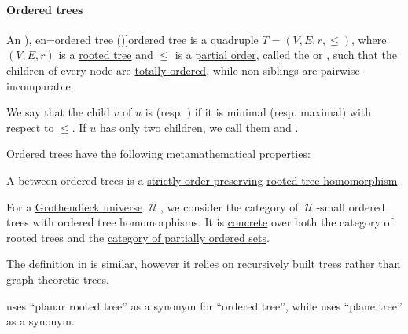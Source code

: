 \paragraph{Ordered trees}

\begin{definition}\label{def:ordered_tree}\mimprovised
  An \term[ru=упорядоченное дерево (\cite[\S 9.3.5]{Новиков2013ДискретнаяМатематика}), en=ordered tree (\cite[573]{Stanley2012CombinatoricsVol1})]{ordered tree} is a quadruple \( T = (V, E, r, \leq) \), where \( (V, E, r) \) is a \hyperref[def:rooted_tree]{rooted tree} and \( {\leq} \) is a \hyperref[def:partially_ordered_set]{partial order}, called the  or , such that the children of every node are \hyperref[def:totally_order_chain]{totally ordered}, while non-siblings are pairwise-incomparable.

  \begin{thmenum}[series=def:ordered_tree]
     We say that the child \( v \) of \( u \) is  (resp. ) if it is minimal (resp. maximal) with respect to \( {\leq} \). If \( u \) has only two children, we call them  and .
  \end{thmenum}

  Ordered trees have the following metamathematical properties:
  \begin{thmenum}
     A  between ordered trees is a \hyperref[def:order_function/preserving]{strictly order-preserving} \hyperref[def:rooted_tree/homomorphism]{rooted tree homomorphism}.

     For a \hyperref[def:grothendieck_universe]{Grothendieck universe} \( \mscrU \), we consider the category of \( \mscrU \)-small ordered trees with ordered tree homomorphisms. It is \hyperref[def:concrete_category]{concrete} over both the category of rooted trees and the \hyperref[def:partially_ordered_set]{category of partially ordered sets}.
  \end{thmenum}
\end{definition}
\begin{comments}
  \item The definition in \cite[573]{Stanley2012CombinatoricsVol1} is similar, however it relies on recursively built trees rather than graph-theoretic trees.

  \item {} uses \enquote{planar rooted tree} as a synonym for \enquote{ordered tree}, while \cite[573]{Stanley2012CombinatoricsVol1} uses \enquote{plane tree} as a synonym.
\end{comments}

